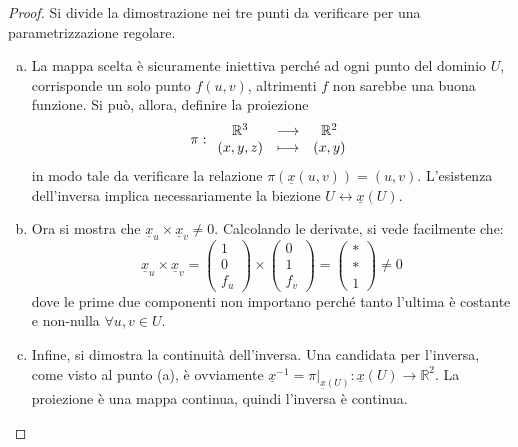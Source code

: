 \documentclass[12pt]{article}
\theoremstyle{style}
\numberwithin{equation}{subsection}
\begin{document}
\begin{proof}
	Si divide la dimostrazione nei tre punti da verificare per una parametrizzazione regolare.
	\begin{enumerate}[(a).]
		\item La mappa scelta \`e sicuramente iniettiva perch\'e ad ogni punto del dominio $U$, corrisponde un solo punto $f(u,v)$, altrimenti $f$ non sarebbe una buona funzione.
			Si pu\`o, allora, definire la proiezione 
			\[
				\pi : 
			\begin{array}
				{c c c}
				\mathbb{R}^3& \longrightarrow& \mathbb{R}^2\\
				(x,y,z) &\longmapsto & (x,y)
			\end{array}
			\] 
		in modo tale da verificare la relazione $\pi(\underline{x}(u,v)) = (u,v)$.
		L'esistenza dell'inversa implica necessariamente la biezione $U \longleftrightarrow \underline{x}(U)$.
	\item Ora si mostra che $\underline{x}_u \times \underline{x}_v \neq 0$. 
		Calcolando le derivate, si vede facilmente che:
		\[
		\underline{x}_u \times \underline{x}_v = \begin{pmatrix} 1 \\ 0 \\ f_u  \end{pmatrix} \times \begin{pmatrix} 0 \\ 1 \\ f_v \end{pmatrix} = \begin{pmatrix} * \\ *\\ 1 \end{pmatrix} \neq 0
		\] 
		dove le prime due componenti non importano perch\'e tanto l'ultima \`e costante e non-nulla $\forall u,v \in U$.
\item Infine, si dimostra la continuit\`a dell'inversa. 
	Una candidata per l'inversa, come visto al punto (a), \`e ovviamente $\underline{x}^{-1} = \pi|_{\underline{x}(U)}  : \underline{x}(U) \to \mathbb{R}^2$.
	La proiezione \`e una mappa continua, quindi l'inversa \`e continua.
	\end{enumerate}
\end{proof}
\end{document}
